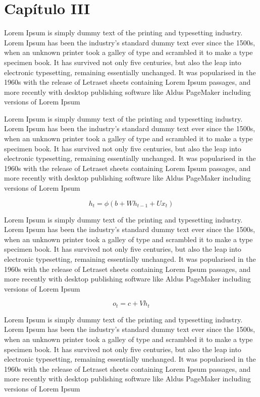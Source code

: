 \chapter{Capítulo III}
\label{cap:meto}

Lorem Ipsum is simply dummy text of the printing and typesetting industry. Lorem Ipsum has been the industry's standard dummy text ever since the 1500s, when an unknown printer took a galley of type and scrambled it to make a type specimen book. It has survived not only five centuries, but also the leap into electronic typesetting, remaining essentially unchanged. It was popularised in the 1960s with the release of Letraset sheets containing Lorem Ipsum passages, and more recently with desktop publishing software like Aldus PageMaker including versions of Lorem Ipsum

Lorem Ipsum is simply dummy text of the printing and typesetting industry. Lorem Ipsum has been the industry's standard dummy text ever since the 1500s, when an unknown printer took a galley of type and scrambled it to make a type specimen book. It has survived not only five centuries, but also the leap into electronic typesetting, remaining essentially unchanged. It was popularised in the 1960s with the release of Letraset sheets containing Lorem Ipsum passages, and more recently with desktop publishing software like Aldus PageMaker including versions of Lorem Ipsum

\begin{equation}
h_{t} = \phi(b + Wh_{t-1} + Ux_{t})
\label{eq:expand_vanilla_rnn}
\end{equation}

Lorem Ipsum is simply dummy text of the printing and typesetting industry. Lorem Ipsum has been the industry's standard dummy text ever since the 1500s, when an unknown printer took a galley of type and scrambled it to make a type specimen book. It has survived not only five centuries, but also the leap into electronic typesetting, remaining essentially unchanged. It was popularised in the 1960s with the release of Letraset sheets containing Lorem Ipsum passages, and more recently with desktop publishing software like Aldus PageMaker including versions of Lorem Ipsum

\begin{equation}
    o_{t} = c + Vh_{t}
\label{eq:output_vanilla_rnn}
\end{equation}

Lorem Ipsum is simply dummy text of the printing and typesetting industry. Lorem Ipsum has been the industry's standard dummy text ever since the 1500s, when an unknown printer took a galley of type and scrambled it to make a type specimen book. It has survived not only five centuries, but also the leap into electronic typesetting, remaining essentially unchanged. It was popularised in the 1960s with the release of Letraset sheets containing Lorem Ipsum passages, and more recently with desktop publishing software like Aldus PageMaker including versions of Lorem Ipsum

